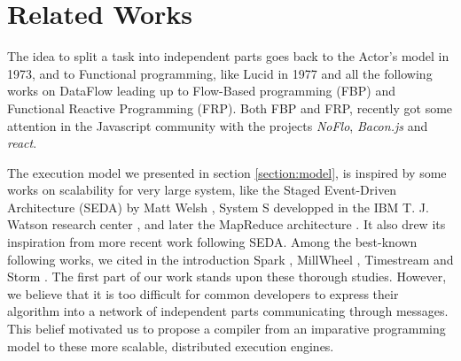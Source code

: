 \section{Related Works} \label{section:related}




The idea to split a task into independent parts goes back to the Actor's model \cite{Hewitt1973} in 1973, and to Functional programming, like Lucid \cite{Ashcroft1977} in 1977 and all the following works on DataFlow leading up to Flow-Based programming (FBP) and Functional Reactive Programming (FRP).
Both FBP and FRP, recently got some attention in the Javascript community with the projects \textit{NoFlo}, \textit{Bacon.js} and \textit{react}.

The execution model we presented in section \ref{section:model}, is inspired by some works on scalability for very large system, like the Staged Event-Driven Architecture (SEDA) by Matt Welsh \cite{Welsh2000}, System S developped in the IBM T. J. Watson research center \cite{Jain2006,Wu2007}, and later the MapReduce architecture \cite{Dean2008}.
It also drew its inspiration from more recent work following SEDA.
Among the best-known following works, we cited in the introduction Spark \cite{Zaharia2010, Zaharia2012}, MillWheel \cite{Akidau2013}, Timestream \cite{Qian2013} and Storm \cite{Toshniwal2014}.
The first part of our work stands upon these thorough studies.
However, we believe that it is too difficult for common developers to express their algorithm into a network of independent parts communicating through messages.
This belief motivated us to propose a compiler from an imparative programming model to these more scalable, distributed execution engines.

